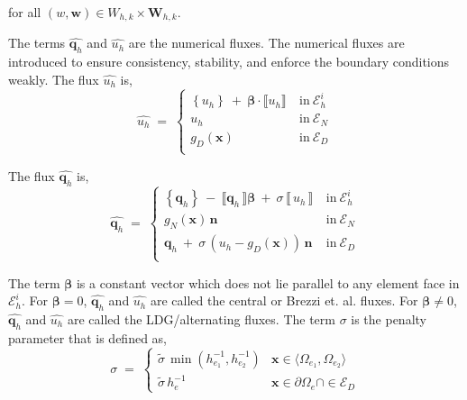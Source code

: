 \documentclass[12pt,letterpaper]{article}
\begin{document}
\noindent
for all $(w,\textbf{w}) \in W_{h,k} \times \textbf{W}_{h,k}$.


\vspace{2mm}

\noindent
The terms $\widehat{\textbf{q}_{h}}$ and $\widehat{u_{h}}$ are the numerical fluxes. The numerical fluxes are introduced to ensure consistency, stability, and enforce the boundary conditions weakly.  The flux $\widehat{u_{h}}$ is,
\begin{equation} \label{eq:UFLUX}
\widehat{u_{h}} \; = \; \left\{
\begin{array}{cl}
\left\{ u_{h} \right\} \ + \ \boldsymbol \beta \cdot \llbracket u_{h} \rrbracket &  \ \text{in} \  \mathcal{E}_{h}^{i} \\
u_{h} &  \ \text{in} \ \mathcal{E}_{N}\\
g_{D}(\textbf{x})  & \ \text{in} \ \mathcal{E}_{D} \\
\end{array}
\right.
\end{equation}


\noindent
The flux $\widehat{\textbf{q}_{h}}$ is,
\begin{equation} \label{eq:QFLUX}
\widehat{\textbf{q}_{h}}  \; = \; \left\{
\begin{array}{cl}
\left\{ \textbf{q}_{h} \right\} \ - \  \llbracket \textbf{q}_{h} \, \rrbracket \boldsymbol \beta \ + \ \sigma \, \llbracket \, u_{h} \, 
\rrbracket & \ \text{in} \ \mathcal{E}_{h}^{i} \\
g_{N}(\textbf{x}) \, \textbf{n} \,  & \ \text{in} \ \mathcal{E}_{N}\\
\textbf{q}_{h} \ + \ \sigma \, \left(u_{h} - g_{D}(\textbf{x}) \right) \, \textbf{n} & \ \text{in} \ \mathcal{E}_{D} \\
\end{array}
\right.
\end{equation}

\noindent
The term $\boldsymbol \beta$ is a constant vector which does not lie parallel to any element face in $ \mathcal{E}_{h}^{i}$.  For $\boldsymbol \beta =  0$,  $\widehat{\textbf{q}_{h}}$ and $\widehat{u_{h}}$ are called the central or Brezzi et. al. fluxes. For  $\boldsymbol \beta \neq  0$, $\widehat{\textbf{q}_{h}}$ and $\widehat{u_{h}}$ are called the LDG/alternating fluxes.  The term $\sigma$ is the penalty parameter that is defined as,
\begin{equation}
\sigma \; = \; \left\{ 
\begin{array}{cc}
\tilde{\sigma} \, \min \left( h^{-1}_{e_{1}}, h^{-1}_{e_{2}} \right) & \textbf{x} \in \langle \Omega_{e_{1}}, \Omega_{e_{2}} \rangle \\
\tilde{\sigma}  \, h^{-1}_{e} & \textbf{x} \in \partial \Omega_{e} \cap \in \mathcal{E}_{D}
\end{array}
\right. 
\label{eq:Penalty}
\end{equation}
\end{document}
